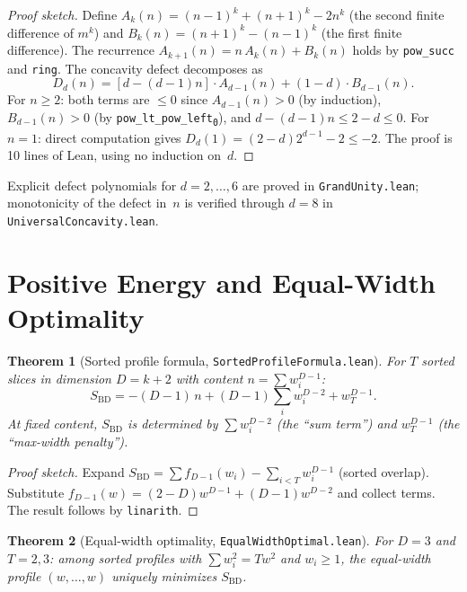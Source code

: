\documentclass[11pt,a4paper]{article}
\newtheorem{theorem}{Theorem}[section]
\theoremstyle{remark}
\begin{document}
\begin{proof}[Proof sketch]
Define $A_k(n) = (n{-}1)^k + (n{+}1)^k - 2n^k$ (the second finite difference of
$m^k$) and $B_k(n) = (n{+}1)^k - (n{-}1)^k$ (the first finite difference).
The recurrence $A_{k+1}(n) = n\,A_k(n) + B_k(n)$ holds by \texttt{pow\_succ}
and \texttt{ring}. The concavity defect decomposes as
\[
  D_d(n) = [d - (d{-}1)n] \cdot A_{d-1}(n) + (1{-}d) \cdot B_{d-1}(n).
\]
For $n \geq 2$: both terms are $\leq 0$ since $A_{d-1}(n) > 0$ (by induction),
$B_{d-1}(n) > 0$ (by \texttt{pow\_lt\_pow\_left\textsubscript{0}}), and
$d - (d{-}1)n \leq 2 - d \leq 0$. For $n = 1$: direct computation gives
$D_d(1) = (2{-}d)2^{d-1} - 2 \leq -2$.
The proof is 10 lines of Lean, using no induction on~$d$.
\end{proof}

Explicit defect polynomials for $d = 2, \ldots, 6$ are proved in
\texttt{GrandUnity.lean}; monotonicity of the defect in~$n$ is verified through
$d = 8$ in \texttt{UniversalConcavity.lean}.

\section{Positive Energy and Equal-Width Optimality}\label{sec:optimal}

\begin{theorem}[Sorted profile formula, \texttt{SortedProfileFormula.lean}]
\label{thm:sorted}
For $T$ sorted slices in dimension $D = k{+}2$ with content $n = \sum w_i^{D-1}$:
\begin{equation}
  S_{\mathrm{BD}} = -(D{-}1)\,n + (D{-}1)\sum_i w_i^{D-2} + w_T^{D-1}.
\end{equation}
At fixed content, $S_{\mathrm{BD}}$ is determined by $\sum w_i^{D-2}$ (the
``sum term'') and $w_T^{D-1}$ (the ``max-width penalty'').
\end{theorem}

\begin{proof}[Proof sketch]
Expand $S_{\mathrm{BD}} = \sum f_{D-1}(w_i) - \sum_{i<T} w_i^{D-1}$ (sorted
overlap). Substitute $f_{D-1}(w) = (2{-}D)w^{D-1} + (D{-}1)w^{D-2}$ and collect
terms. The result follows by \texttt{linarith}.
\end{proof}

\begin{theorem}[Equal-width optimality, \texttt{EqualWidthOptimal.lean}]
\label{thm:optimal}
For $D = 3$ and $T = 2, 3$: among sorted profiles with $\sum w_i^2 = Tw^2$ and
$w_i \geq 1$, the equal-width profile $(w,\ldots,w)$ uniquely minimizes
$S_{\mathrm{BD}}$.
\end{theorem}
\end{document}
